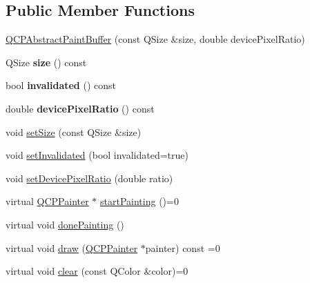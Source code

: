 \subsection*{Public Member Functions}
\begin{DoxyCompactItemize}
\item 
\hyperlink{class_q_c_p_abstract_paint_buffer_a3ce532c12f10b81697108835755641e2}{Q\+C\+P\+Abstract\+Paint\+Buffer} (const Q\+Size \&size, double device\+Pixel\+Ratio)
\item 
\mbox{\label{class_q_c_p_abstract_paint_buffer_a3ea8284e547985c5d263f26a6adfa11f}} 
Q\+Size {\bfseries size} () const
\item 
\mbox{\label{class_q_c_p_abstract_paint_buffer_a76bf771cda945a6c602cf9b7d365d92b}} 
bool {\bfseries invalidated} () const
\item 
\mbox{\label{class_q_c_p_abstract_paint_buffer_aac1b981f8c1744036610ff1a6b9461f9}} 
double {\bfseries device\+Pixel\+Ratio} () const
\item 
void \hyperlink{class_q_c_p_abstract_paint_buffer_a8b68c3cd36533f1a4a23b5ce8cd66f01}{set\+Size} (const Q\+Size \&size)
\item 
void \hyperlink{class_q_c_p_abstract_paint_buffer_ae4c7dc70dfc66be2879ce297b2b3d67f}{set\+Invalidated} (bool invalidated=true)
\item 
void \hyperlink{class_q_c_p_abstract_paint_buffer_a555eaad5d5c806420ff35602a1bb68fa}{set\+Device\+Pixel\+Ratio} (double ratio)
\item 
virtual \hyperlink{class_q_c_p_painter}{Q\+C\+P\+Painter} $\ast$ \hyperlink{class_q_c_p_abstract_paint_buffer_a9e9f29b19c033cf02fb96f1a148463f3}{start\+Painting} ()=0
\item 
virtual void \hyperlink{class_q_c_p_abstract_paint_buffer_a41b0dc6e7744f19fae09f8532c207dc1}{done\+Painting} ()
\item 
virtual void \hyperlink{class_q_c_p_abstract_paint_buffer_afb998c7525e3ae37d9d2d46c7aaf461a}{draw} (\hyperlink{class_q_c_p_painter}{Q\+C\+P\+Painter} $\ast$painter) const =0
\item 
virtual void \hyperlink{class_q_c_p_abstract_paint_buffer_a9e253f4541dfc01992b77e8830bd7722}{clear} (const Q\+Color \&color)=0
\item 
\mbox{\label{class_q_c_p_abstract_paint_buffer_a3ce532c12f10b81697108835755641e2}} 

\end{DoxyCompactItemize}
